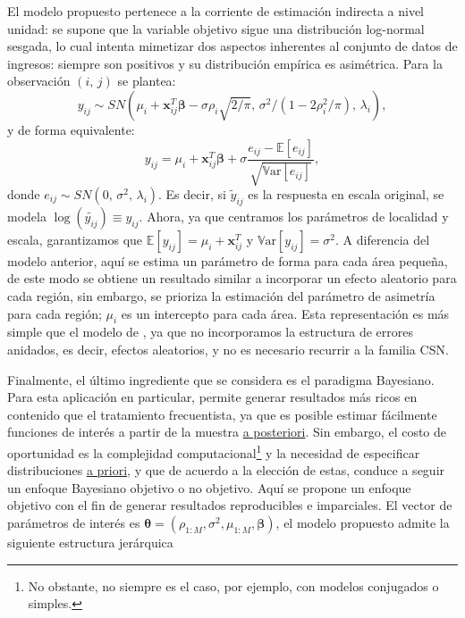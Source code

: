 \documentclass[11pt]{article}
\begin{document}
El modelo propuesto pertenece a la corriente de estimación indirecta a nivel unidad: se supone que la variable objetivo sigue una distribución log-normal sesgada, lo cual intenta mimetizar dos aspectos inherentes al conjunto de datos de ingresos: siempre son positivos y su distribución empírica es asimétrica. Para la observación $(i,\, j)$ se plantea:
\begin{equation}
y_{ij} \sim SN(\mu_{i} + \boldsymbol{x}_{ij}^{T}\boldsymbol{\beta} - \sigma\rho_{i}\sqrt{2/\pi},\, \sigma^{2}/(1-2\rho_{i}^{2}/\pi),\, \lambda_{i}),
\end{equation}
y de forma equivalente:
\begin{equation}
y_{ij} = \mu_{i} + \boldsymbol{x}_{ij}^{T}\boldsymbol{\beta} + \sigma\frac{e_{ij}-\mathbb{E}[e_{ij}]}{\sqrt{\mathbb{V}\text{ar}[e_{ij}]}} ,
\end{equation}
donde $e_{ij}\sim SN(0,\, \sigma^{2},\, \lambda_{i})$. Es decir, si $\tilde{y}_{ij}$ es la respuesta en escala original, se modela $\log(\tilde{y_{ij}}) \equiv y_{ij}$. Ahora, ya que centramos los parámetros de localidad y escala, garantizamos que $\mathbb{E}[y_{ij}] = \mu_{i} + \boldsymbol{x}_{ij}^{T}$ y $\mathbb{V}\text{ar}[y_{ij}] = \sigma^{2}$. A diferencia del modelo anterior, aquí se estima un parámetro de forma para cada área pequeña, de este modo se obtiene un resultado similar a incorporar un efecto aleatorio para cada región, sin embargo, se prioriza la estimación del parámetro de asimetría para cada región; $\mu_{i}$ es un intercepto para cada área. Esta representación es más simple que el modelo de \textcite{BHF-SN}, ya que no incorporamos la estructura de errores anidados, es decir, efectos aleatorios, y no es necesario recurrir a la familia CSN.

Finalmente, el último ingrediente que se considera es el paradigma Bayesiano. Para esta aplicación en particular, permite generar resultados más ricos en contenido que el tratamiento frecuentista, ya que es posible estimar fácilmente funciones de interés a partir de la muestra \underline{a posteriori}. Sin embargo, el costo de oportunidad es la complejidad computacional\footnote{No obstante, no siempre es el caso, por ejemplo, con modelos conjugados o simples.} y la necesidad de especificar distribuciones \underline{a priori}, y que de acuerdo a la elección de estas, conduce a seguir un enfoque Bayesiano objetivo o no objetivo. Aquí se propone un enfoque objetivo con el fin de generar resultados reproducibles e imparciales. El vector de parámetros de interés es $\boldsymbol{\theta}=(\rho_{1:M}, \sigma^{2}, \mu_{1:M}, \boldsymbol{\beta})$, el modelo propuesto admite la siguiente estructura jerárquica
\end{document}
